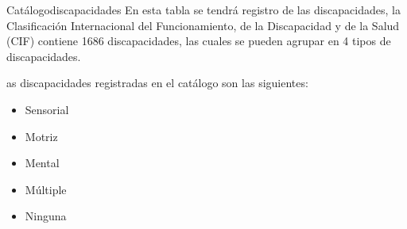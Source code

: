 \begin{BD}{  Catálogo}{discapacidades }{
		En esta tabla se tendrá registro de las discapacidades, la Clasificación Internacional del Funcionamiento, de la Discapacidad y de la Salud (CIF) contiene 1686 discapacidades, las cuales se pueden agrupar en 4 tipos de discapacidades. \cite{DIS}
} %
		

			
\end{BD}

as discapacidades registradas en el catálogo son las siguientes:
\begin{itemize}
    \item Sensorial
	\item Motriz
	\item Mental
	\item Múltiple
	\item Ninguna
\end{itemize}
